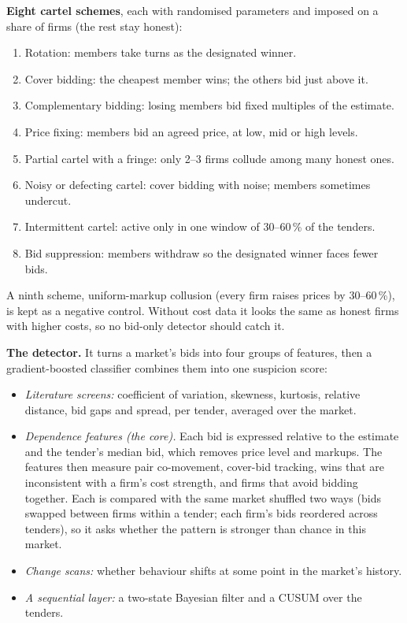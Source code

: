 \documentclass[11pt,a4paper]{article}
\begin{document}
\textbf{Eight cartel schemes}, each with randomised parameters and imposed on a share of firms (the rest stay honest):
\begin{enumerate}[leftmargin=2em]
\item Rotation: members take turns as the designated winner.
\item Cover bidding: the cheapest member wins; the others bid just above it.
\item Complementary bidding: losing members bid fixed multiples of the estimate.
\item Price fixing: members bid an agreed price, at low, mid or high levels.
\item Partial cartel with a fringe: only 2--3 firms collude among many honest ones.
\item Noisy or defecting cartel: cover bidding with noise; members sometimes undercut.
\item Intermittent cartel: active only in one window of 30--60\,\% of the tenders.
\item Bid suppression: members withdraw so the designated winner faces fewer bids.
\end{enumerate}

A ninth scheme, uniform-markup collusion (every firm raises prices by 30--60\,\%), is kept as a negative control. Without cost data it looks the same as honest firms with higher costs, so no bid-only detector should catch it.

\textbf{The detector.} It turns a market's bids into four groups of features, then a gradient-boosted classifier combines them into one suspicion score:
\begin{itemize}
\item \emph{Literature screens:} coefficient of variation, skewness, kurtosis, relative distance, bid gaps and spread, per tender, averaged over the market.
\item \emph{Dependence features (the core).} Each bid is expressed relative to the estimate and the tender's median bid, which removes price level and markups. The features then measure pair co-movement, cover-bid tracking, wins that are inconsistent with a firm's cost strength, and firms that avoid bidding together. Each is compared with the same market shuffled two ways (bids swapped between firms within a tender; each firm's bids reordered across tenders), so it asks whether the pattern is stronger than chance in this market.
\item \emph{Change scans:} whether behaviour shifts at some point in the market's history.
\item \emph{A sequential layer:} a two-state Bayesian filter and a CUSUM over the tenders.
\end{itemize}
\end{document}
